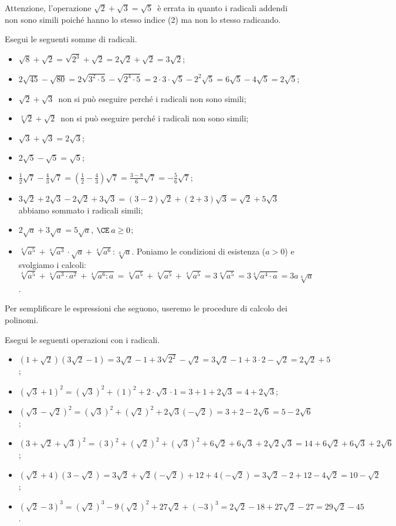 Attenzione, l'operazione $\sqrt 2+\sqrt 3=\sqrt 5$\, è errata in quanto i radicali addendi non sono simili poiché hanno lo stesso indice (2) ma non lo stesso radicando.
\pagebreak
\begin{exrig}
 \begin{esempio}
Esegui le seguenti somme di radicali.
\begin{itemize}
 \item $\sqrt 8+\sqrt 2=\sqrt{2^3}+\sqrt 2=2\sqrt 2+\sqrt 2=3\sqrt 2$;
 \item $2\sqrt{45}-\sqrt{80}=2\sqrt{3^2\cdot 5}-\sqrt{2^4\cdot 5}=2\cdot 3\cdot \sqrt 5-2^2\sqrt 5=6\sqrt 5-4\sqrt 5=2\sqrt 5$;
 \item $\sqrt 2+\sqrt 3$\, non si può eseguire perché i radicali non sono simili;
 \item $\sqrt[3]2+\sqrt 2$\, non si può eseguire perché i radicali non sono simili;
 \item $\sqrt 3+\sqrt 3=2\sqrt 3$;
 \item $2\sqrt 5-\sqrt 5=\sqrt 5$;
 \item $\frac 1 2\sqrt 7-\frac 4 3\sqrt 7=\left(\frac 1 2-\frac 4 3\right)\sqrt 7=\frac{3-8} 6\sqrt 7=-\frac 5 6\sqrt 7$;
 \item $3\sqrt 2+2\sqrt 3-2\sqrt 2+3\sqrt 3=(3-2)\sqrt 2+(2+3)\sqrt 3=\sqrt 2+5\sqrt 3$\, abbiamo sommato i radicali simili;
 \item $2\sqrt a+3\sqrt a=5\sqrt a$, $\CE\: a\ge 0$;
 \item $\sqrt[4]{a^5}+\sqrt[4]{a^3}\cdot \sqrt a+\sqrt[4]{a^6}:\sqrt[4]a$. Poniamo le condizioni di esistenza ($a>0$) e svolgiamo i calcoli: $\sqrt[4]{a^5}+\sqrt[4]{a^3\cdot a^2}+\sqrt[4]{a^6:a}=\sqrt[4]{a^5}+\sqrt[4]{a^5}+\sqrt[4]{a^5}=3\sqrt[4]{a^5}=3\sqrt[4]{a^4\cdot a}=3a\sqrt[4]a$.
\end{itemize}
 \end{esempio}
\end{exrig}
Per semplificare le espressioni che seguono, useremo le procedure di calcolo dei polinomi.
\begin{exrig}
 \begin{esempio}
Esegui le seguenti operazioni con i radicali.
\begin{itemize}
 \item $(1+\sqrt 2)(3\sqrt 2-1)=3\sqrt 2-1+3\sqrt {2^2}-\sqrt 2=3\sqrt 2-1+3\cdot 2-\sqrt 2=2\sqrt 2+5$;
 \item $(\sqrt 3+1)^2=(\sqrt 3)^2+(1)^2+2\cdot \sqrt 3\cdot 1=3+1+2\sqrt 3=4+2\sqrt 3$;
 \item $(\sqrt 3-\sqrt 2)^2=(\sqrt 3)^2+(\sqrt 2)^2+2 \sqrt 3 (-\sqrt 2)=3+2-2\sqrt 6=5-2\sqrt 6$;
 \item $(3+\sqrt 2+\sqrt 3)^2=(3)^2+(\sqrt 2)^2+(\sqrt 3)^2+6 \sqrt 2+6 \sqrt 3+2 \sqrt 2 \sqrt 3=14+6\sqrt 2+6\sqrt 3+2\sqrt 6$;
 \item $(\sqrt 2+4)(3-\sqrt 2)=3\sqrt 2 +\sqrt 2(-\sqrt 2)+12+4(-\sqrt 2)=3\sqrt 2-2+12-4\sqrt 2=10-\sqrt 2$;
 \item $(\sqrt 2-3)^3=(\sqrt 2)^3-9(\sqrt 2)^2+27\sqrt 2+(-3)^3=2\sqrt 2-18+27\sqrt 2-27=29\sqrt 2-45$.
\end{itemize}
 \end{esempio}
\end{exrig}
